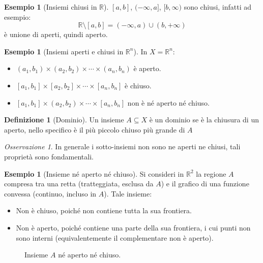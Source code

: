 \documentclass[11pt, a4paper, openright]{book}
\theoremstyle{plain}
\theoremstyle{definition}
\newtheorem{definizione}[teorema]{Definizione}
\newtheorem{esempio}[teorema]{Esempio}
\theoremstyle{remark}
\newtheorem{osservazione}[teorema]{Osservazione}
\begin{document}
\begin{esempio}[Insiemi chiusi in $\mathbb{R}$]
    $[a, b]$, $(-\infty, a]$, $[b, \infty)$ sono chiusi, infatti ad esempio:
    \begin{equation}
        \mathbb{R} \setminus [a, b] = (-\infty, a) \cup (b, +\infty)
    \end{equation}
    è unione di aperti, quindi aperto.
\end{esempio}

\begin{esempio}[Insiemi aperti e chiusi in $\mathbb{R}^n$]
    In $X = \mathbb{R}^n$:
    \begin{itemize}
        \item $(a_1, b_1) \times (a_2, b_2) \times \cdots \times (a_n, b_n)$ è aperto.
        \item $[a_1, b_1] \times [a_2, b_2] \times \cdots \times [a_n, b_n]$ è chiuso.
        \item $[a_1, b_1] \times (a_2, b_2) \times \cdots \times [a_n, b_n]$ non è né aperto né chiuso.
    \end{itemize}
\end{esempio}

\begin{definizione}[Dominio]
    Un insieme $A \subseteq X$ è un dominio se è la chiusura di un aperto, nello specifico è il più piccolo chiuso più grande di $A$ 
\end{definizione}

\begin{osservazione}
    In generale i sotto-insiemi non sono ne aperti ne chiusi, tali proprietà sono fondamentali.
\end{osservazione}

\begin{esempio}[Insieme né aperto né chiuso]
    Si consideri in $\mathbb{R}^2$ la regione $A$ compresa tra una retta (tratteggiata, esclusa da $A$) e il grafico di una funzione convessa (continuo, incluso in $A$). Tale insieme:
    \begin{itemize}
        \item Non è chiuso, poiché non contiene tutta la sua frontiera.
        \item Non è aperto, poiché contiene una parte della sua frontiera, i cui punti non sono interni (equivalentemente il complementare non è aperto).
    \end{itemize}
\begin{figure}[H]
    \centering
    \caption{Insieme $A$ né aperto né chiuso.}
\end{figure}
\end{esempio}
\end{document}
